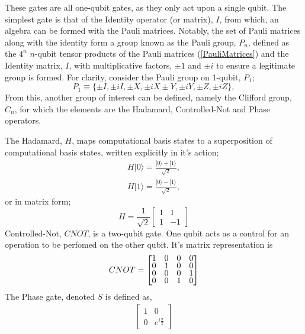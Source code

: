 These gates are all one-qubit gates, as they only act upon a single qubit.
The simplest gate is that of the Identity operator (or matrix), $I$, from which, an algebra
can be formed with the Pauli matrices. Notably, the set of Pauli matrices along with the identity form
a group known as the Pauli group, $P_n$, defined as the $4^n$ $n$-qubit tensor products of the Pauli matrices (\ref{PauliMatrices}) and the
Identity matrix, $I$, with multiplicative factors, $\pm 1$ and $\pm i$ to ensure a legitimate group is formed.
For clarity, consider the Pauli group on 1-qubit, $P_1$;
\begin{equation}
    P_1 \equiv \{ \pm I, \pm iI, \pm X, \pm iX \pm Y, \pm iY, \pm Z, \pm iZ\},
\end{equation}
From this, another group of interest can be defined, namely the Clifford group, $C_n$, for which the elements are the Hadamard, Controlled-Not and Phase operators.

The Hadamard, $H$, maps computational basis states to a superposition of computational basis states,
written explicitly in it's action;
\begin{align*}
    H |0\rangle = \frac{|0\rangle + |1\rangle}{\sqrt{2}}, \\
    H |1\rangle = \frac{|0\rangle - |1\rangle}{\sqrt{2}},
\end{align*}
or in matrix form;
\begin{equation*}
    H = \frac{1}{\sqrt{2}} \begin{bmatrix}
        1 & 1  \\
        1 & -1
    \end{bmatrix}
\end{equation*}
Controlled-Not, $CNOT$,  is a two-qubit gate. One qubit acts as a control for an operation to be perfomed
on the other qubit. It's matrix representation is
\begin{align}
    \label{CNOT}
    CNOT =
    \renewcommand{\arraystretch}{0.75}
    \begin{bmatrix}
        1 & 0 & 0 & 0 \\
        0 & 1 & 0 & 0 \\
        0 & 0 & 0 & 1 \\
        0 & 0 & 1 & 0
    \end{bmatrix}
\end{align}
The Phase gate, denoted $S$ is defined as,
\begin{align*}
    \begin{bmatrix}
        1 & 0                  \\
        0 & e^{i\frac{\pi}{2}}
    \end{bmatrix}
\end{align*}


